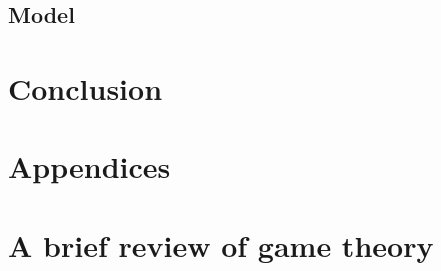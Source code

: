 \documentclass{article}
\begin{document}



\subsection{Model}\label{model_proposal:proposal}





\section{Conclusion}

\printbibliography
\appendix
{}
\section*{Appendices}
\section{A brief review of game theory}\label{appendix-game-theory}


\end{document}
